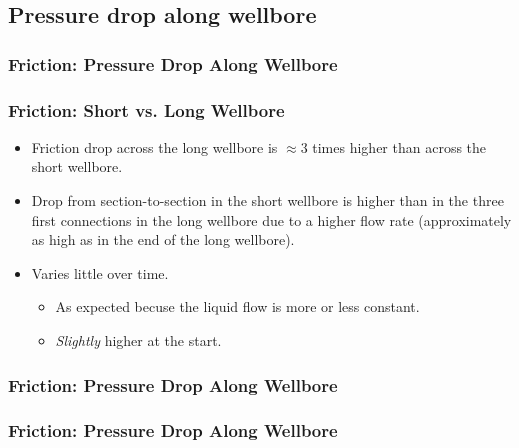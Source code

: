 \subsection{Pressure drop along wellbore}
\begin{frame}
    \frametitle{Friction: Pressure Drop Along Wellbore}
    \centerline{}
\end{frame}

\begin{frame}
    \frametitle{Friction: Short vs. Long Wellbore}
    \begin{itemize}
        \item Friction drop across the long wellbore is $\approx 3$ times higher than across the short wellbore.
        \item Drop from section-to-section in the short wellbore is higher than in the three first connections in the long wellbore due to a higher flow rate (approximately as high as in the end of the long wellbore).
        \item Varies little over time.
        \begin{itemize}
            \item As expected becuse the liquid flow is more or less constant.
            \item \emph{Slightly} higher at the start.
        \end{itemize}
    \end{itemize}
\end{frame}

\begin{frame}
    \frametitle{Friction: Pressure Drop Along Wellbore}
    \centerline{}
\end{frame}

\begin{frame}
    \frametitle{Friction: Pressure Drop Along Wellbore}
    \centerline{}
\end{frame}

